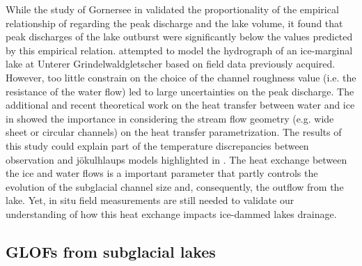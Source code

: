 While the study of Gornersee in \cite{Huss&al2007} validated the proportionality of the empirical relationship of \cite{Clague&Mathews1973} regarding the peak discharge and the lake volume, it found that peak discharges of the lake outburst were significantly below the values predicted by this empirical relation.\cite{Werder&al2010} attempted to model the hydrograph of an ice-marginal lake at Unterer Grindelwaldgletscher based on field data previously acquired. However, too little constrain on the choice of the channel roughness value (i.e. the resistance of the water flow) led to large uncertainties on the peak discharge. The additional and recent theoretical work on the heat transfer between water and ice in \cite{Sommers&Rajaram2020} showed the importance in considering the stream flow geometry (e.g. wide sheet or circular channels) on the heat transfer parametrization. The results of this study could explain part of the temperature discrepancies between observation and jökulhlaups models highlighted in \cite{Clarke2003,Flowers&al2004}. The heat exchange between the ice and water flows is a important parameter that partly controls the evolution of the subglacial channel size and, consequently, the outflow from the lake. Yet, in situ field measurements are still needed to validate our understanding of how this heat exchange impacts ice-dammed lakes drainage.


\subsection{GLOFs from subglacial lakes}
\label{subsection:glofs_subglacial_lakes}


